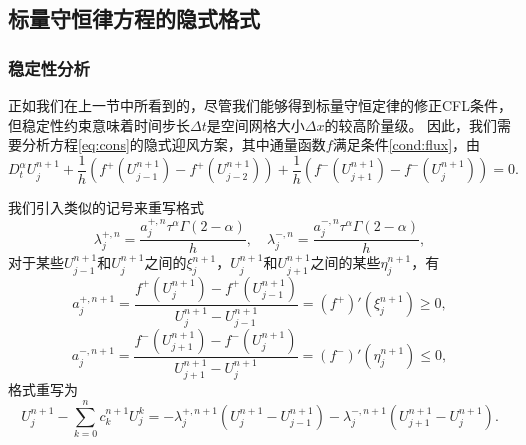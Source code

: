 \subsection{标量守恒律方程的隐式格式}
\subsubsection{稳定性分析}
正如我们在上一节中所看到的，尽管我们能够得到标量守恒定律的修正CFL条件，但稳定性约束意味着时间步长$\Delta t$是空间网格大小$\Delta x $的较高阶量级。 因此，我们需要分析方程\eqref{eq:cons}的隐式迎风方案，其中通量函数$f$满足条件\eqref{cond:flux}，由
\begin{equation}\label{imfirst}
D_t^\alpha U^{n+1}_j + \frac{1}{h} \left(f^+ (U_{j-1}^{n+1})- f^+(U_{j-2}^{n+1}) \right)+\frac{1}{h}\left(f^-(U_{j+1}^{n+1})-f^-(U_j^{n+1})\right) =0.
\end{equation}


我们引入类似的记号来重写格式
\[
\lambda^{+,n}_j = \frac{a^{+,n}_j  \tau^\alpha \Gamma (2-\alpha)}  {h}, \quad \lambda^{-,n}_j = \frac{a^{-,n}_j  \tau^\alpha \Gamma (2-\alpha)}  {h},
\]
对于某些$U^{n+1}_{j-1}$和$U^{n+1}_{j}$之间的$\xi^{n+1}_j$，$U^{n+1}_j$和$U^{n+1}_{j+1}$之间的某些$\eta^{n+1}_j$，有
\[
a^{+,n+1}_j=\frac{f^+ (U_j^{n+1})- f^+(U_{j-1}^{n+1})}{U^{n+1}_j-U^{n+1}_{j-1}}=(f^+)' (\xi^{n+1}_j) \ge 0,
\]
\[
a^{-,n+1}_j=\frac{f^- (U_{j+1}^{n+1})- f^-(U_{j}^{n+1})}{U^{n+1}_{j+1}-U^{n+1}_{j}}=(f^-)' (\eta^{n+1}_j) \le 0,
\]
格式重写为
\begin{equation}\label{reform2}
U_j^{n+1}-\sum_{k=0}^{n} c^{n+1}_k U_j^k= -\lambda^{+,n+1}_j \left(U^{n+1}_j-U^{n+1}_{j-1}\right) -  \lambda^{-,n+1}_j \left(U^{n+1}_{j+1}-U^{n+1}_{j}\right).
\end{equation}

